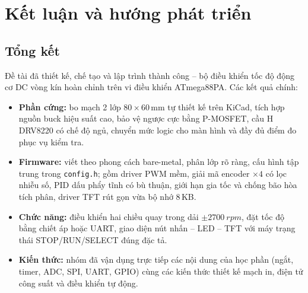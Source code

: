 \chapter{Kết luận và hướng phát triển}
\label{ch:ketluan}

\section{Tổng kết}
Đề tài đã thiết kế, chế tạo và lập trình thành công \textbf{\proj} -- bộ điều khiển tốc độ động cơ DC vòng kín hoàn chỉnh trên vi điều khiển ATmega88PA. Các kết quả chính:
\begin{itemize}
  \item \textbf{Phần cứng:} bo mạch 2 lớp 80\,$\times$\,60\,mm tự thiết kế trên KiCad, tích hợp nguồn buck hiệu suất cao, bảo vệ ngược cực bằng P-MOSFET, cầu H DRV8220 có chế độ ngủ, chuyển mức logic cho màn hình và đầy đủ điểm đo phục vụ kiểm tra.
  \item \textbf{Firmware:} viết theo phong cách bare-metal, phân lớp rõ ràng, cấu hình tập trung trong \texttt{config.h}; gồm driver PWM mềm, giải mã encoder $\times4$ có lọc nhiễu số, PID dấu phẩy tĩnh có bù thuận, giới hạn gia tốc và chống bão hòa tích phân, driver TFT rút gọn vừa bộ nhớ 8\,KB.
  \item \textbf{Chức năng:} điều khiển hai chiều quay trong dải $\pm\SI{2700}{rpm}$, đặt tốc độ bằng chiết áp hoặc UART, giao diện nút nhấn -- LED -- TFT với máy trạng thái STOP/RUN/SELECT đúng đặc tả.
  \item \textbf{Kiến thức:} nhóm đã vận dụng trực tiếp các nội dung của học phần (ngắt, timer, ADC, SPI, UART, GPIO) cùng các kiến thức thiết kế mạch in, điện tử công suất và điều khiển tự động.
\end{itemize}

